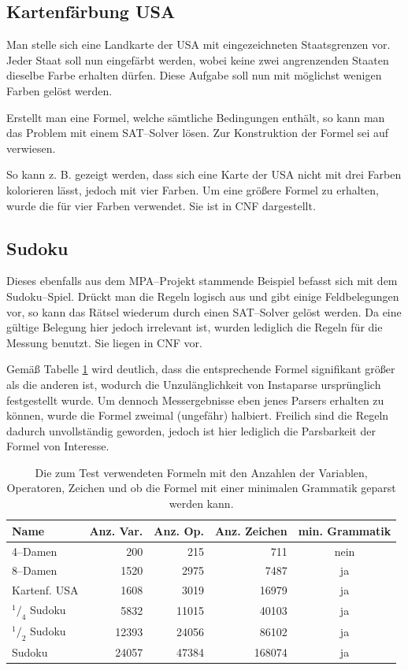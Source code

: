\documentclass[ngerman,a4paper,abstracton,open=right,twoside=false,toc=listofnumbered,bibtotocnumbered]{scrreprt}
\begin{document}
\subsection{Kartenfärbung USA}

Man stelle sich eine Landkarte der USA mit eingezeichneten Staatsgrenzen vor. Jeder Staat soll nun eingefärbt werden, wobei keine zwei angrenzenden Staaten dieselbe Farbe erhalten dürfen. Diese Aufgabe soll nun mit möglichst wenigen Farben gelöst werden.

Erstellt man eine Formel, welche sämtliche Bedingungen enthält, so kann man das Problem mit einem SAT--Solver lösen. Zur Konstruktion der Formel sei auf \cite{mpa-logeleien} verwiesen.

So kann z. B. gezeigt werden, dass sich eine Karte der USA nicht mit drei Farben kolorieren lässt, jedoch mit vier Farben. Um eine größere Formel zu erhalten, wurde die für vier Farben verwendet. Sie ist in CNF dargestellt.

\subsection{Sudoku}

Dieses ebenfalls aus dem MPA--Projekt stammende Beispiel befasst sich mit dem Sudoku--Spiel. Drückt man die Regeln logisch aus und gibt einige Feldbelegungen vor, so kann das Rätsel wiederum durch einen SAT--Solver gelöst werden. Da eine gültige Belegung hier jedoch irrelevant ist, wurden lediglich die Regeln für die Messung benutzt. Sie liegen in CNF vor.

Gemäß Tabelle \ref{formeln-zahlen} wird deutlich, dass die entsprechende Formel signifikant größer als die anderen ist, wodurch die Unzulänglichkeit von Instaparse ursprünglich festgestellt wurde. Um dennoch Messergebnisse eben jenes Parsers erhalten zu können, wurde die Formel zweimal (ungefähr) halbiert. Freilich sind die Regeln dadurch unvollständig geworden, jedoch ist hier lediglich die Parsbarkeit der Formel von Interesse.

\begin{table}[h]
	\begin{tabular}{|l|r|r|r|c|}
		\hline
		\textbf{Name} & \textbf{Anz. Var.} & \textbf{Anz. Op.} & \textbf{Anz. Zeichen} & \textbf{min. Grammatik} \\ \hline
		4--Damen & 200 & 215 & 711 & nein \\ \hline
		8--Damen & 1520 & 2975 & 7487 & ja \\ \hline
		Kartenf. USA & 1608 & 3019 & 16979 & ja \\ \hline
		$^1/_4$ Sudoku & 5832 & 11015 & 40103 & ja \\ \hline
		$^1/_2$ Sudoku & 12393 & 24056 & 86102 & ja \\ \hline
		Sudoku & 24057 & 47384 & 168074 & ja \\ \hline
	\end{tabular}
	\caption{Die zum Test verwendeten Formeln mit den Anzahlen der Variablen, Operatoren, Zeichen und ob die Formel mit einer minimalen Grammatik geparst werden kann.}
	\label{formeln-zahlen}
\end{table}
\end{document}
